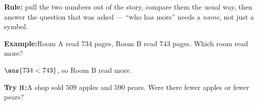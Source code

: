 \documentclass[12pt]{article}
\begin{document}
\begin{formulabox}
\textbf{Rule:} pull the two numbers out of the story, compare them the usual
way, then answer the question that was asked --- ``who has more'' needs a
\emph{name}, not just a symbol.
\end{formulabox}
\begin{examplebox}
\textbf{Example:}\quad Room A read $734$ pages, Room B read $743$ pages. Which
room read more?
\par
$\ans{734 < 743}$, so Room B read more.
\end{examplebox}
\begin{tryitbox}
\textbf{Try it:}\quad A shop sold $509$ apples and $590$ pears. Were there
fewer apples or fewer pears?\\[2pt]
\end{tryitbox}
\end{document}
